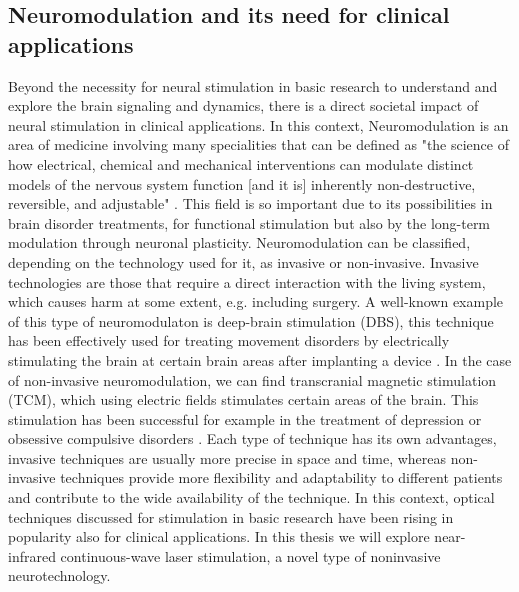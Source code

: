 \subsection{Neuromodulation and its need for clinical applications}


Beyond the necessity for neural stimulation in basic research to understand and explore the brain signaling and dynamics, there is a direct societal impact of neural stimulation in clinical applications. In this context, Neuromodulation is an area of medicine involving many specialities that can be defined as "the science of how electrical, chemical and mechanical interventions can modulate distinct models of the nervous system function [and it is] inherently non-destructive, reversible, and adjustable" \parencite{krames_neuromodulation_2009}. This field is so important due to its possibilities in brain disorder treatments, for functional stimulation but also by the long-term modulation through neuronal plasticity. Neuromodulation can be classified, depending on the technology used for it, as invasive or non-invasive. Invasive technologies are those that require a direct interaction with the living system, which causes harm at some extent, e.g. including surgery. A well-known example of this type of neuromodulaton is deep-brain stimulation (DBS), this technique has been effectively used for treating movement disorders by electrically stimulating the brain at certain brain areas after implanting a device \parencite{limousin_longterm_2019, hariz_deep_2022}. In the case of non-invasive neuromodulation, we can find transcranial magnetic stimulation (TCM), which using electric fields stimulates certain areas of the brain. This stimulation has been successful for example in the treatment of depression or obsessive compulsive disorders  \parencite{valero-cabre_transcranial_2017, clarke_patients_2018}. Each type of technique has its own advantages, invasive techniques are usually more precise in space and time, whereas non-invasive techniques provide more flexibility and adaptability to different patients and contribute to the wide availability of the technique. In this context, optical techniques discussed for stimulation in basic research have been rising in popularity also for clinical applications. In this thesis we will explore near-infrared continuous-wave laser stimulation, a novel type of noninvasive neurotechnology. 












